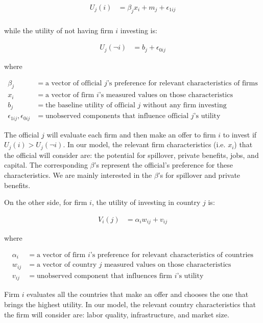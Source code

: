 \begin{align}
U_j(i) &= \beta_j x_i + m_j + \epsilon_{1ij} \\
\end{align}

while the utility of not having firm $i$ investing is:

\begin{align}
U_j(\neg i) &= b_j + \epsilon_{0ij}
\end{align}

where

\begin{align*}
\beta_j &= \text{a vector of official $j$'s preference for relevant characteristics of firms} \\
x_i &= \text{a vector of firm $i$'s measured values on those characteristics} \\
b_j &= \text{the baseline utility of official $j$ without any firm investing} \\
\epsilon_{1ij}, \epsilon_{0ij} &= \text{unobserved components that influence official $j$'s utility}
\end{align*}

The official $j$ will evaluate each firm and then make an offer to firm $i$ to invest if $U_j(i) > U_j(\neg i)$. In our model, the relevant firm characteristics (i.e. $x_i$) that the official will consider are: the potential for spillover, private benefits, jobs, and capital. The corresponding $\beta$'s represent the official's preference for these characteristics. We are mainly interested in the $\beta$'s for spillover and private benefits.

On the other side, for firm $i$, the utility of investing in country $j$ is:

\begin{align}
V_i(j) &= \alpha_i w_{ij} + v_{ij}
\end{align}

where

\begin{align*}
\alpha_i &= \text{a vector of firm $i$'s preference for relevant characteristics of countries} \\
w_{ij} &= \text{a vector of country $j$ measured values on those characteristics} \\
v_{ij} &= \text{unobserved component that influences firm $i$'s utility}
\end{align*}

Firm $i$ evaluates all the countries that make an offer and chooses the one that brings the highest utility. In our model, the relevant country characteristics that the firm will consider are: labor quality, infrastructure, and market size.


